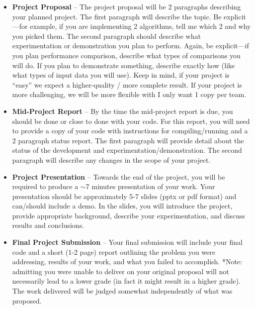 \documentclass[a4paper,12pt]{article}
\begin{document}
\begin{itemize}
    \item \textbf{Project Proposal} -- The project proposal will be 2 paragraphs describing your planned project. The first paragraph will describe the topic. Be explicit---for example, if you are implementing 2 algorithms, tell me which 2 and why you picked them. The second paragraph should describe what experimentation or demonstration you plan to perform. Again, be explicit---if you plan performance comparison, describe what types of comparisons you will do. If you plan to demonstrate something, describe exactly how (like what types of input data you will use). Keep in mind, if your project is ``easy'' we expect a higher-quality / more complete result. If your project is more challenging, we will be more flexible with I only want 1 copy per team.
    
    \item \textbf{Mid-Project Report} -- By the time the mid-project report is due, you should be done or close to done with your code. For this report, you will need to provide a copy of your code with instructions for compiling/running and a 2 paragraph status report. The first paragraph will provide detail about the status of the development and experimentation/demonstration. The second paragraph will describe any changes in the scope of your project.
    
    \item \textbf{Project Presentation} -- Towards the end of the project, you will be required to produce a $\sim$7 minutes presentation of your work. Your presentation should be approximately 5-7 slides (pptx or pdf format) and can/should include a demo. In the slides, you will introduce the project, provide appropriate background, describe your experimentation, and discuss results and conclusions. 

    \item \textbf{Final Project Submission} -- Your final submission will include your final code and a short (1-2 page) report outlining the problem you were addressing, results of your work, and what you failed to accomplish. *Note: admitting you were unable to deliver on your original proposal will not necessarily lead to a lower grade (in fact it might result in a higher grade). The work delivered will be judged somewhat independently of what was proposed.
        
\end{itemize}

\newpage
\end{document}
